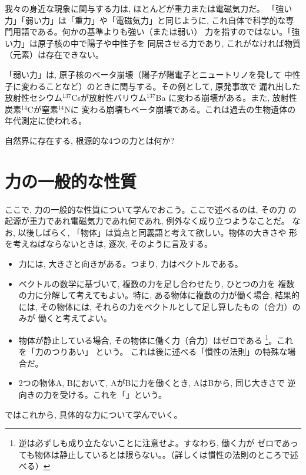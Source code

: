 我々の身近な現象に関与する力は, ほとんどが重力または電磁気力だ。
「強い力」「弱い力」は「重力」や「電磁気力」と同じように, 
これ自体で科学的な専門用語である。何かの基準よりも強い（または弱い）
力を指すのではない。「強い力」は原子核の中で陽子や中性子を
同居させる力であり, これがなければ物質（元素）は存在できない。

「弱い力」は, 原子核のベータ崩壊（陽子が陽電子とニュートリノを発して
中性子に変わることなど）のときに関与する。その例として, 原発事故で
漏れ出した放射性セシウム$^{137}$Csが放射性バリウム$^{137}$Ba
に変わる崩壊がある。また, 放射性炭素$^{14}$Cが窒素$^{14}$Nに
変わる崩壊もベータ崩壊である。これは過去の生物遺体の年代測定に使われる。

\begin{q}\label{q:4forece}
自然界に存在する, 根源的な4つの力とは何か?
\end{q}
\hv


\section{力の一般的な性質}

ここで, 力の一般的な性質について学んでおこう。ここで述べるのは, その力
の起源が重力であれ電磁気力であれ何であれ, 例外なく成り立つようなことだ。
なお, 以後しばらく, 「物体」は質点と同義語と考えて欲しい。物体の大きさや
形を考えねばならないときは, 逐次, そのように言及する。

\begin{itemize}
\item 力には, 大きさと向きがある。つまり, 力はベクトルである。
\item ベクトルの数学に基づいて, 複数の力を足し合わせたり, ひとつの力を
複数の力に分解して考えてもよい。特に, ある物体に複数の力が働く場合, 結果的
には, その物体には, それらの力をベクトルとして足し算したもの（合力）のみが
働くと考えてよい。
\item 物体が静止している場合, その物体に働く力（合力）はゼロである
\footnote{逆は必ずしも成り立たないことに注意せよ。すなわち, 働く力が
ゼロであっても物体は静止しているとは限らない。。（詳しくは慣性の法則のところで述べる）}。これを「力のつりあい」 という。
これは後に述べる「慣性の法則」の特殊な場合だ。
\item 2つの物体A, Bにおいて, AがBに力を働くとき, AはBから, 同じ大きさで
逆向きの力を受ける。これを「」という。
\end{itemize}
\mv
ではこれから, 具体的な力について学んでいく。\\



